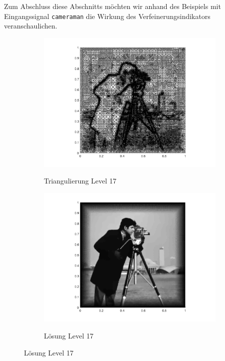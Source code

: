 Zum Abschluss diese Abschnitts möchten wir anhand des Beispiels mit
Eingangssignal \texttt{cameraman} die Wirkung des Verfeinerungsindikators
veranschaulichen.
\begin{figure}[p]
  \centering
  \begin{subfigure}[b]{.48\linewidth}
    \centering
    \caption{Triangulierung Level 17}
    \includegraphics[trim = 100 30 80 20, clip, width=\linewidth]
      {pictures/chapExperiments/secGrayscale/cam/adaptive/lvl17/triangulation.png}
    \label{fig:camLvl17Triang}
  \end{subfigure}
  \quad
  \begin{subfigure}[b]{.48\linewidth}
    \centering
    \caption{Lösung Level 17}
    \includegraphics[trim = 100 30 80 20, clip, width=\linewidth]
      {pictures/chapExperiments/secGrayscale/cam/adaptive/lvl17/solutionGrayscale.png}
    \label{fig:camLvl17Sol}
  \end{subfigure}


\end{figure}
